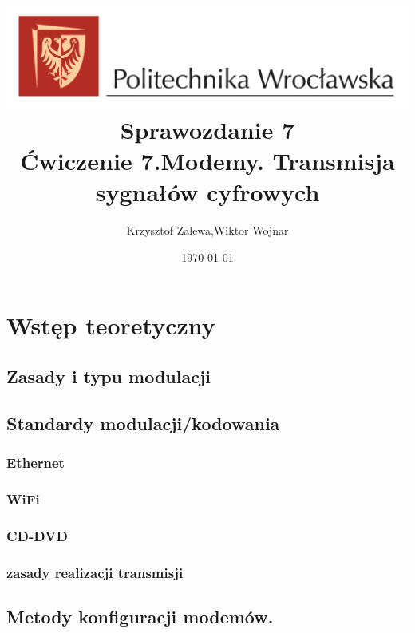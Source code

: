 \documentclass{article}
\title{
  \centering
  \includegraphics[width=\textwidth]{images/logo_PWr_kolor_poziom.png}\\
  \fontsize{28pt}{30pt}\selectfont Sprawozdanie 7\\
  \fontsize{14pt}{30pt}\selectfont Ćwiczenie 7.Modemy. Transmisja sygnałów cyfrowych}
\author{Krzysztof Zalewa,Wiktor Wojnar}
\date{\daymonthyear\today}
\begin{document}
    \maketitle
    \pagebreak
    \tableofcontents
    \FloatBarrier
    \section{Wstęp teoretyczny}
        \subsection{Zasady i typu modulacji}
        \subsection{Standardy modulacji/kodowania}
            \subsubsection{Ethernet}
            \subsubsection{WiFi}
            \subsubsection{CD-DVD}
            \subsubsection{zasady realizacji transmisji}
        \subsection{Metody konfiguracji modemów.}
\end{document}
